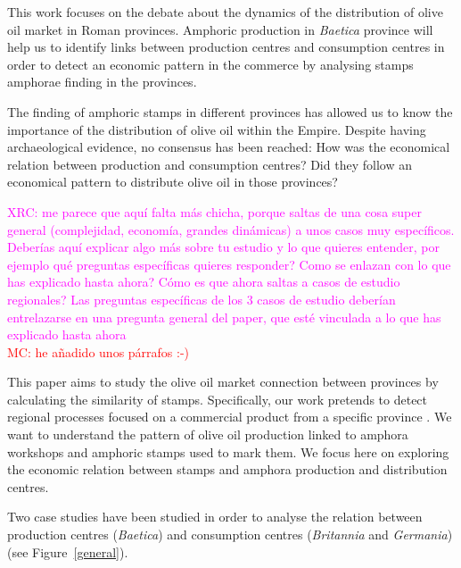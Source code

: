 \documentclass[review]{elsarticle}
\newcommand{\memo}[2]{\textcolor{#1}{#2}}
\newcommand{\maria}[1]{\memo{red}{MC: #1\\}}
\newcommand{\xavi}[1]{\memo{magenta}{XRC: #1\\}}
\begin{document}
This work focuses on the debate about the dynamics of the distribution of olive oil market in Roman provinces. Amphoric production in \textit{Baetica} province will help us to identify links between production centres and consumption centres in order to detect an economic pattern in the commerce by analysing stamps amphorae finding in the provinces. 

The finding of amphoric stamps in different provinces has allowed us to know the importance of the distribution of olive oil within the Empire. Despite having archaeological evidence, no consensus has been reached: How was the economical relation between production and consumption centres? Did they follow an economical pattern to distribute olive oil in those provinces?
  

\xavi{me parece que aquí falta más chicha, porque saltas de una cosa super general (complejidad, economía, grandes dinámicas) a unos casos muy específicos. Deberías aquí explicar algo más sobre tu estudio y lo que quieres entender, por ejemplo qué preguntas específicas quieres responder? Como se enlazan con lo que has explicado hasta ahora? Cómo es que ahora saltas a casos de estudio regionales? Las preguntas específicas de los 3 casos de estudio deberían entrelazarse en una pregunta general del paper, que esté vinculada a lo que has explicado hasta ahora}
\maria{he añadido unos párrafos :-)}

This paper aims to study the olive oil market connection between provinces by calculating the similarity of stamps. Specifically, our work pretends to detect regional processes focused on a commercial product from a specific province \citep{isaksen_network_2006}. We want to understand the pattern of olive oil production linked to amphora workshops and amphoric stamps used to mark them. We focus here on exploring the economic relation between stamps and amphora production and distribution centres. 

Two case studies have been studied in order to analyse the relation between production centres (\textit{Baetica}) and consumption centres (\textit{Britannia} and \textit{Germania}) (see Figure~\ref{general}).
\end{document}
